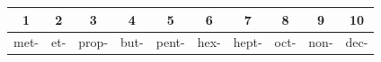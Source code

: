 \begin{center}
    {\small
    \begin{tabular}{@{}cccccccccc@{}}
        \toprule
        \textbf{1} & \textbf{2} & \textbf{3} & \textbf{4} & \textbf{5} & \textbf{6} & \textbf{7} & \textbf{8} & \textbf{9} & \textbf{10} \\
        \midrule
        met- & et- & prop- & but- & pent- & hex- & hept- & oct- & non- & dec- \\
        \bottomrule
    \end{tabular}
    }
\end{center}

